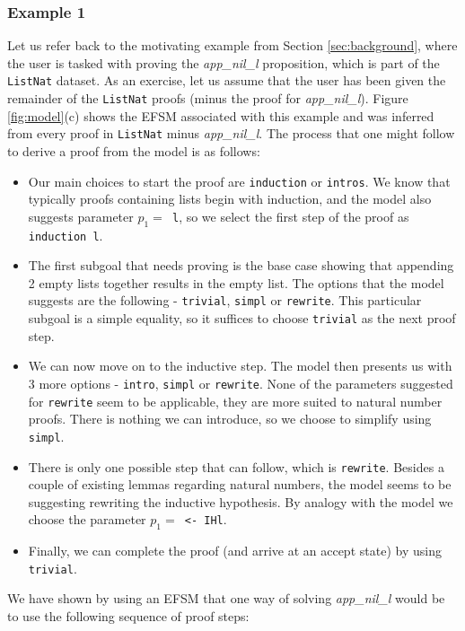 \documentclass{llncs}
\begin{document}
\subsubsection{Example 1}
Let us refer back to the motivating example from Section \ref{sec:background}, where the user is tasked with proving the \emph{app\_nil\_l} proposition, which is part of the \texttt{ListNat} dataset. As an exercise, let us assume that the user has been given the remainder of the \texttt{ListNat} proofs (minus the proof for \emph{app\_nil\_l}). Figure \ref{fig:model}(c) shows the EFSM associated with this example and was inferred from every proof in \texttt{ListNat} minus \emph{app\_nil\_l}. The process that one might follow to derive a proof from the model is as follows: 
\begin{itemize}
\item{Our main choices to start the proof are \texttt{induction} or \texttt{intros}. We know that typically proofs containing lists begin with induction, and the model also suggests parameter $p_1=$\texttt{ l}, so we select the first step of the proof as \texttt{induction l}.}
\item{The first subgoal that needs proving is the base case showing that appending 2 empty lists together results in the empty list. The options that the model suggests are the following - \texttt{trivial}, \texttt{simpl} or \texttt{rewrite}. This particular subgoal is a simple equality, so it suffices to choose \texttt{trivial} as the next proof step.}
\item{We can now move on to the inductive step. The model then presents us with 3 more options - \texttt{intro}, \texttt{simpl} or \texttt{rewrite}. None of the parameters suggested for \texttt{rewrite} seem to be applicable, they are more suited to natural number proofs. There is nothing we can introduce, so we choose to simplify using \texttt{simpl}.}
\item{There is only one possible step that can follow, which is \texttt{rewrite}. Besides a couple of existing lemmas regarding natural numbers, the model seems to be suggesting rewriting the inductive hypothesis. By analogy with the model we choose the parameter $p_1=$\texttt{ <- IHl}.}
\item{Finally, we can complete the proof (and arrive at an accept state) by using \texttt{trivial}.}
\end{itemize}

We have shown by using an EFSM that one way of solving \emph{app\_nil\_l} would be to use the following sequence of proof steps: 
\end{document}
